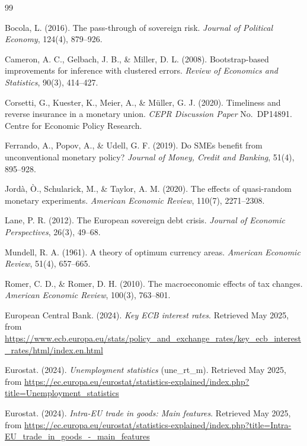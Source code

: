 \documentclass[11pt,a4paper]{article}
\begin{document}
\begin{thebibliography}{99}

 Bocola, L. (2016). The pass-through of sovereign risk. 
\textit{Journal of Political Economy}, 124(4), 879--926.

 Cameron, A. C., Gelbach, J. B., \& Miller, D. L. (2008). 
Bootstrap-based improvements for inference with clustered errors. 
\textit{Review of Economics and Statistics}, 90(3), 414--427.

 Corsetti, G., Kuester, K., Meier, A., \& M\"{u}ller, G. J. 
(2020). Timeliness and reverse insurance in a monetary union. 
\textit{CEPR Discussion Paper} No.\ DP14891. Centre for Economic Policy Research.

 Ferrando, A., Popov, A., \& Udell, G. F. (2019). Do SMEs 
benefit from unconventional monetary policy? \textit{Journal of Money, Credit and 
Banking}, 51(4), 895--928.

 Jord\`{a}, \`{O}., Schularick, M., \& Taylor, A. M. (2020). 
The effects of quasi-random monetary experiments. \textit{American Economic 
Review}, 110(7), 2271--2308.

 Lane, P. R. (2012). The European sovereign debt crisis. 
\textit{Journal of Economic Perspectives}, 26(3), 49--68.

 Mundell, R. A. (1961). A theory of optimum currency areas. 
\textit{American Economic Review}, 51(4), 657--665.

 Romer, C. D., \& Romer, D. H. (2010). The macroeconomic 
effects of tax changes. \textit{American Economic Review}, 100(3), 763--801.

 European Central Bank. (2024). \textit{Key ECB interest rates}. 
Retrieved May 2025, from \url{https://www.ecb.europa.eu/stats/policy_and_exchange_rates/key_ecb_interest_rates/html/index.en.html}

 Eurostat. (2024). \textit{Unemployment statistics} 
(une\_rt\_m). Retrieved May 2025, from \url{https://ec.europa.eu/eurostat/statistics-explained/index.php?title=Unemployment_statistics}

 Eurostat. (2024). \textit{Intra-EU trade in goods: Main 
features}. Retrieved May 2025, from \url{https://ec.europa.eu/eurostat/statistics-explained/index.php?title=Intra-EU_trade_in_goods_-_main_features}

\end{thebibliography}
\end{document}
